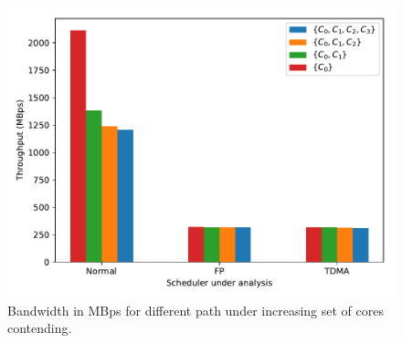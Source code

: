 
\begin{figure}
  \centering
  \includegraphics[scale=0.45]{images/bw_comparisons_no_ts.pdf}
  \caption{Bandwidth in MBps for different path under increasing set of cores contending.}
  \label{fig:bandwidth_comparison}
\end{figure}

